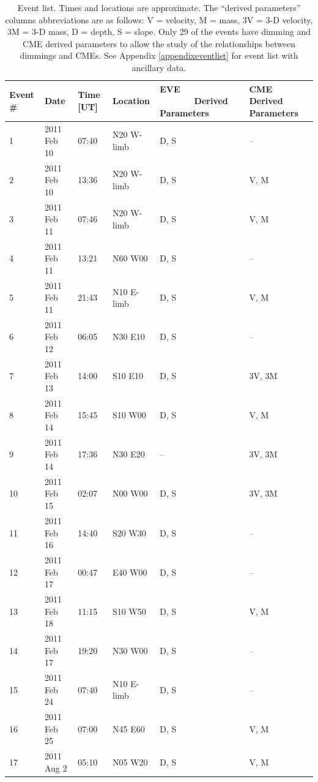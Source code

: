 \newpage
\begin{singlespace}
\begin{table}[H]
    \caption[Semi-statistical study event list]{
        Event list. Times and locations are approximate. The “derived parameters” columns abbreviations are as follows: V = 
        velocity, M = mass, 3V = 3-D velocity, 3M = 3-D mass, D = depth, S = slope. Only 29 of the events have dimming and 
        CME derived parameters to allow the study of the relationships between dimmings and CMEs. 
        See Appendix \ref{appendixeventlist} for event list with ancillary data. 
    }
    \begin{center}
    \begin{tabular}{|l|l|l|l|p{2.0cm}|p{2.0cm}|} \hline
	Event \# & Date & Time [UT] & Location & EVE \ \ \ \ \ \ \ Derived Parameters & CME Derived Parameters \\ \hline \hline
	1 & 2011 Feb 10 & 07:40 & N20 W-limb & D, S & -- \\ \hline
	2 & 2011 Feb 10 & 13:36 & N20 W-limb & D, S & V, M  \\ \hline
	3 & 2011 Feb 11 & 07:46 & N20 W-limb & D, S & V, M \\ \hline
	4 & 2011 Feb 11 & 13:21 & N60 W00 & D, S & -- \\ \hline
	5 & 2011 Feb 11 & 21:43 & N10 E-limb & D, S & V, M \\ \hline
	6 & 2011 Feb 12 & 06:05 & N30 E10 & D, S & -- \\ \hline
	7 & 2011 Feb 13 & 14:00 & S10 E10 & D, S & 3V, 3M \\ \hline
	8 & 2011 Feb 14 & 15:45 & S10 W00 & D, S & V, M \\ \hline
	9 & 2011 Feb 14 & 17:36 & N30 E20 & -- & 3V, 3M \\ \hline
	10 & 2011 Feb 15 & 02:07 & N00 W00 & D, S & 3V, 3M \\ \hline
	11 & 2011 Feb 16 & 14:40 & S20 W30 & D, S & -- \\ \hline
	12 & 2011 Feb 17 & 00:47 & E40 W00 & D, S & -- \\ \hline
	13 & 2011 Feb 18 & 11:15 & S10 W50 & D, S & V, M \\ \hline
	14 & 2011 Feb 17 & 19:20 & N30 W00 & D, S & -- \\ \hline
	15 & 2011 Feb 24 & 07:40 & N10 E-limb & D, S & -- \\ \hline
	16 & 2011 Feb 25 & 07:00 & N45 E60 & D, S & V, M \\ \hline
	17 & 2011 Aug 2 & 05:10 & N05 W20 & D, S & V, M \\ \hline

\end{tabular}
\end{center}
\end{table}
\end{singlespace}

